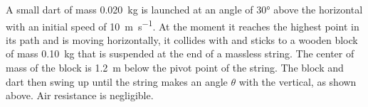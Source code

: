 \documentclass{../../oss-apphys-exam}
\newcounter{lastmc}
\begin{document}
\begin{questions}    
  \setcounter{question}{\value{lastmc}}
  
  \question A small dart of mass \SI{.020}{\kilo\gram} is launched at an angle
  of \ang{30} above the horizontal with an initial speed of
  \SI{10}{\meter\per\second}. At the moment it reaches the highest point in its
  path and is moving horizontally, it collides with and sticks to a wooden
  block of mass \SI{.10}{\kilo\gram} that is suspended at the end of a massless
  string. The center of mass of the block is \SI{1.2}{\metre} below the pivot
  point of the string. The block and dart then swing up until the string makes
  an angle $\theta$ with the vertical, as shown above. Air resistance is
  negligible.
\end{questions}
\end{document}
